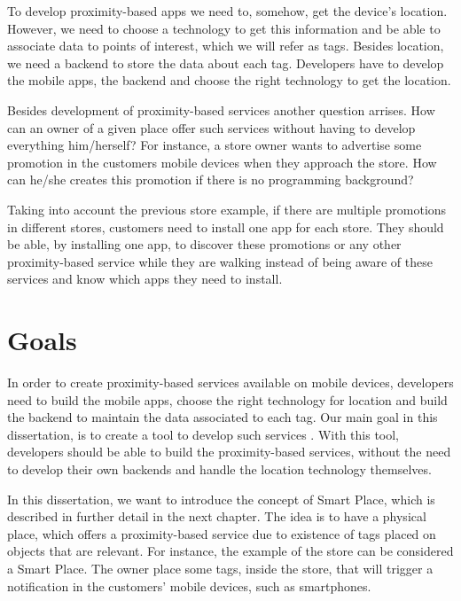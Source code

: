 To develop proximity-based apps we need to, somehow, get the device's location.
However, we need to choose a technology to get this information and be able to associate data to points of interest, which we will refer as tags.
Besides location, we need a backend to store the data about each tag.
Developers have to develop the mobile apps, the backend and choose the right technology to get the location.

Besides development of proximity-based services another question arrises.
How can an owner of a given place offer such services without having to develop everything him/herself?
For instance, a store owner wants to advertise some promotion in the customers mobile devices when they approach the store.
How can he/she creates this promotion if there is no programming background?

Taking into account the previous store example, if there are multiple promotions in different stores, customers need to install one app for each store.
They should be able, by installing one app, to discover these promotions or any other proximity-based service while they are walking instead of being aware of these services and know which apps they need to install.

\section{Goals}
\label{sec:introduction_goals}
In order to create proximity-based services available on mobile devices, developers need to build the mobile apps, choose the right technology for location and build the backend to maintain the data associated to each tag.
Our main goal in this dissertation, is to create a tool to develop such services%
.
With this tool, developers should be able to build the proximity-based services, without the need to develop their own backends and handle the location technology themselves.

In this dissertation, we want to introduce the concept of Smart Place, which is described in further detail in the next chapter.
The idea is to have a physical place, which offers a proximity-based service due to existence of tags placed on objects that are relevant.
For instance, the example of the store can be considered a Smart Place.
The owner place some tags, inside the store, that will trigger a notification in the customers' mobile devices, such as smartphones.

